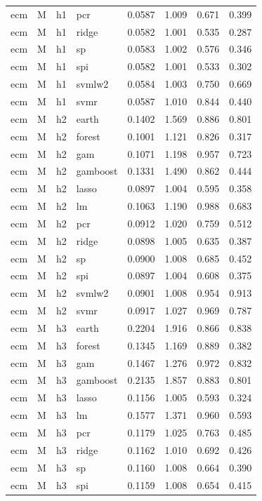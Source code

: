 \begin{ThreePartTable}
\begin{longtable}[t]{llclcccc}
ecm & M & h1 & pcr & 0.0587 & 1.009 & 0.671 & 0.399\\
ecm & M & h1 & ridge & 0.0582 & 1.001 & 0.535 & 0.287\\
ecm & M & h1 & sp & 0.0583 & 1.002 & 0.576 & 0.346\\
ecm & M & h1 & spi & 0.0582 & 1.001 & 0.533 & 0.302\\
ecm & M & h1 & svmlw2 & 0.0584 & 1.003 & 0.750 & 0.669\\
ecm & M & h1 & svmr & 0.0587 & 1.010 & 0.844 & 0.440\\
\addlinespace
ecm & M & h2 & earth & 0.1402 & 1.569 & 0.886 & 0.801\\
ecm & M & h2 & forest & 0.1001 & 1.121 & 0.826 & 0.317\\
ecm & M & h2 & gam & 0.1071 & 1.198 & 0.957 & 0.723\\
ecm & M & h2 & gamboost & 0.1331 & 1.490 & 0.862 & 0.444\\
ecm & M & h2 & lasso & 0.0897 & 1.004 & 0.595 & 0.358\\
ecm & M & h2 & lm & 0.1063 & 1.190 & 0.988 & 0.683\\
ecm & M & h2 & pcr & 0.0912 & 1.020 & 0.759 & 0.512\\
ecm & M & h2 & ridge & 0.0898 & 1.005 & 0.635 & 0.387\\
ecm & M & h2 & sp & 0.0900 & 1.008 & 0.685 & 0.452\\
ecm & M & h2 & spi & 0.0897 & 1.004 & 0.608 & 0.375\\
ecm & M & h2 & svmlw2 & 0.0901 & 1.008 & 0.954 & 0.913\\
ecm & M & h2 & svmr & 0.0917 & 1.027 & 0.969 & 0.787\\
\addlinespace
ecm & M & h3 & earth & 0.2204 & 1.916 & 0.866 & 0.838\\
ecm & M & h3 & forest & 0.1345 & 1.169 & 0.889 & 0.382\\
ecm & M & h3 & gam & 0.1467 & 1.276 & 0.972 & 0.832\\
ecm & M & h3 & gamboost & 0.2135 & 1.857 & 0.883 & 0.801\\
ecm & M & h3 & lasso & 0.1156 & 1.005 & 0.593 & 0.324\\
ecm & M & h3 & lm & 0.1577 & 1.371 & 0.960 & 0.593\\
ecm & M & h3 & pcr & 0.1179 & 1.025 & 0.763 & 0.485\\
ecm & M & h3 & ridge & 0.1162 & 1.010 & 0.692 & 0.426\\
ecm & M & h3 & sp & 0.1160 & 1.008 & 0.664 & 0.390\\
ecm & M & h3 & spi & 0.1159 & 1.008 & 0.654 & 0.415\\

\end{longtable}
\end{ThreePartTable}
